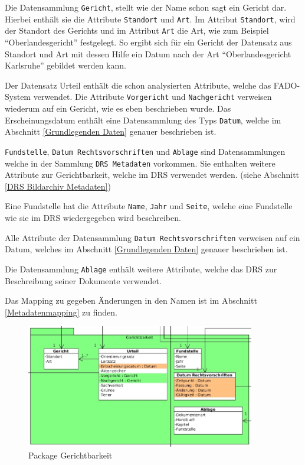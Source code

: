 Die Datensammlung \texttt{Gericht}, stellt wie der Name schon sagt ein Gericht dar. Hierbei enth\"alt sie die Attribute \texttt{Standort} und \texttt{Art}. Im Attribut \texttt{Standort}, wird der Standort des Gerichts und im Attribut \texttt{Art} die Art, wie zum Beispiel "`Oberlandesgericht"' festgelegt. So ergibt sich f\"ur ein Gericht der Datensatz aus Standort und Art mit dessen Hilfe ein Datum nach der Art "`Oberlandesgericht Karlsruhe"' gebildet werden kann.

Der Datensatz Urteil enth\"alt die schon analysierten Attribute, welche das \ac{FADO}-System verwendet. Die Attribute \texttt{Vorgericht} und \texttt{Nachgericht} verweisen wiederum auf ein Gericht, wie es eben beschrieben wurde. Das Erscheinungsdatum enth\"alt eine Datensammlung des Typs \texttt{Datum}, welche im Abschnitt \ref{Grundlegenden Daten} genauer beschrieben ist.

\texttt{Fundstelle}, \texttt{Datum Rechtsvorschriften} und \texttt{Ablage} sind Datensammlungen welche in der Sammlung \texttt{DRS Metadaten} vorkommen. Sie enthalten weitere Attribute zur Gerichtbarkeit, welche im \ac{DRS} verwendet werden. (siehe Abschnitt \ref{DRS Bildarchiv Metadaten})

Eine Fundstelle hat die Attribute \texttt{Name}, \texttt{Jahr} und \texttt{Seite}, welche eine Fundstelle wie sie im \ac{DRS} wiedergegeben wird beschreiben. 

Alle Attribute der Datensammlung \texttt{Datum Rechtsvorschriften} verweisen auf ein Datum, welches im Abschnitt \ref{Grundlegenden Daten} genauer beschrieben ist.

Die Datensammlung \texttt{Ablage} enth\"alt weitere Attribute, welche das \ac{DRS} zur Beschreibung seiner Dokumente verwendet.

Das Mapping zu gegeben \"Anderungen in den Namen ist im Abschnitt \ref{Metadatenmapping} zu finden.
\begin{figure}[!ht]
\centering
\includegraphics[width=10cm]{Bilder/Datenmodell/Package-Gerichtbarkeit.jpg}
\caption{Package Gerichtbarkeit}
\label{Package Gerichtbarkeit}
\centering
\end{figure}

